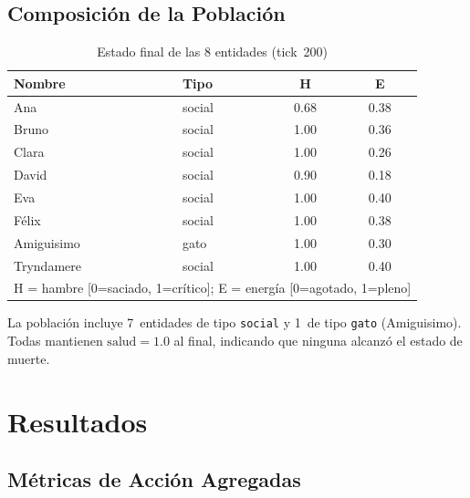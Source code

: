 \documentclass[11pt,a4paper,twocolumn]{article}
\begin{document}
\subsection{Composici\'on de la Poblaci\'on}

\begin{table}[h]
  \centering
  \caption{Estado final de las 8 entidades (tick~200)}
  \label{tab:poblacion}
  \small
  \begin{tabular}{llcc}
    \toprule
    \textbf{Nombre} & \textbf{Tipo} & \textbf{H} & \textbf{E} \\
    \midrule
    Ana         & social & \textcolor{warncolor}{0.68} & 0.38 \\
    Bruno       & social & \textcolor{critcolor}{1.00} & 0.36 \\
    Clara       & social & \textcolor{critcolor}{1.00} & 0.26 \\
    David       & social & \textcolor{critcolor}{0.90} & \textcolor{warncolor}{0.18} \\
    Eva         & social & \textcolor{critcolor}{1.00} & 0.40 \\
    F\'elix     & social & \textcolor{critcolor}{1.00} & 0.38 \\
    Amiguisimo  & gato   & \textcolor{critcolor}{1.00} & 0.30 \\
    Tryndamere  & social & \textcolor{critcolor}{1.00} & 0.40 \\
    \bottomrule
    \multicolumn{4}{l}{\footnotesize H = hambre [0=saciado, 1=cr\'itico]; E = energ\'ia [0=agotado, 1=pleno]}
  \end{tabular}
\end{table}

La poblaci\'on incluye 7~entidades de tipo \texttt{social} y
1~de tipo \texttt{gato} (Amiguisimo). Todas mantienen
$\text{salud}=1.0$ al final, indicando que ninguna alcanz\'o el
estado de muerte.

\section{Resultados}

\subsection{M\'etricas de Acci\'on Agregadas}
\end{document}
